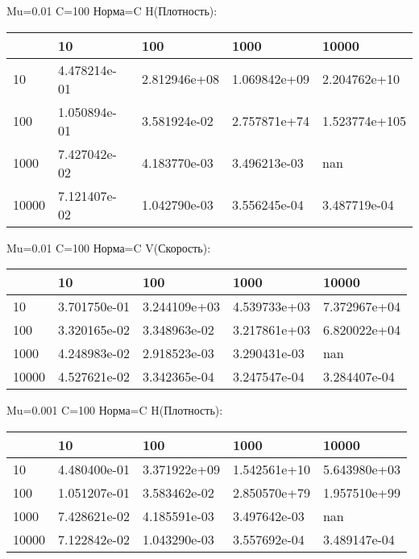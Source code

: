 \documentclass[a4paper, 12pt]{article}
\begin{document}
\bigskip
\bigskip
\bigskip


Mu=0.01  C=100 Норма=C H(Плотность):


\begin{tabular}{lllll}
\toprule
{} &         10    &         100   &         1000  &          10000 \\
\midrule
10    &  4.478214e-01 &  2.812946e+08 &  1.069842e+09 &   2.204762e+10 \\
100   &  1.050894e-01 &  3.581924e-02 &  2.757871e+74 &  1.523774e+105 \\
1000  &  7.427042e-02 &  4.183770e-03 &  3.496213e-03 &            nan \\
10000 &  7.121407e-02 &  1.042790e-03 &  3.556245e-04 &   3.487719e-04 \\
\bottomrule
\end{tabular}



\bigskip
\bigskip
\bigskip


Mu=0.01  C=100 Норма=C V(Скорость):


\begin{tabular}{lllll}
\toprule
{} &         10    &         100   &         1000  &         10000 \\
\midrule
10    &  3.701750e-01 &  3.244109e+03 &  4.539733e+03 &  7.372967e+04 \\
100   &  3.320165e-02 &  3.348963e-02 &  3.217861e+03 &  6.820022e+04 \\
1000  &  4.248983e-02 &  2.918523e-03 &  3.290431e-03 &           nan \\
10000 &  4.527621e-02 &  3.342365e-04 &  3.247547e-04 &  3.284407e-04 \\
\bottomrule
\end{tabular}



\bigskip
\bigskip
\bigskip


Mu=0.001  C=100 Норма=C H(Плотность):


\begin{tabular}{lllll}
\toprule
{} &         10    &         100   &         1000  &         10000 \\
\midrule
10    &  4.480400e-01 &  3.371922e+09 &  1.542561e+10 &  5.643980e+03 \\
100   &  1.051207e-01 &  3.583462e-02 &  2.850570e+79 &  1.957510e+99 \\
1000  &  7.428621e-02 &  4.185591e-03 &  3.497642e-03 &           nan \\
10000 &  7.122842e-02 &  1.043290e-03 &  3.557692e-04 &  3.489147e-04 \\
\bottomrule
\end{tabular}
\end{document}

